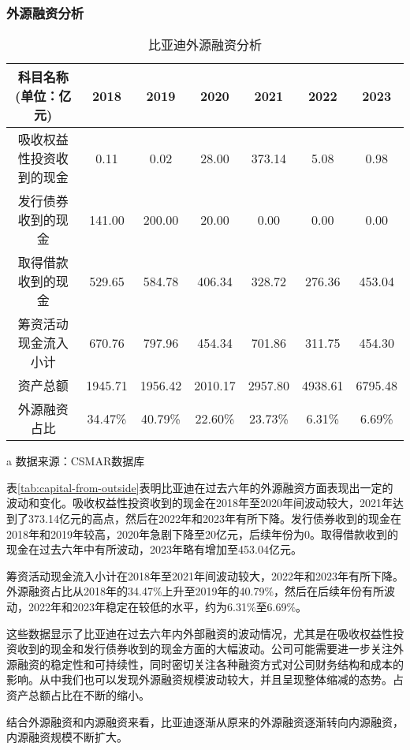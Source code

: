 \subsubsection{外源融资分析}
\begin{table}
  \centering
  \begin{threeparttable}[c]
    \caption{比亚迪外源融资分析}
    \label{tab:capital-from-outside}
    \begin{tabular}{ccccccc}
      \toprule
        科目名称(单位：亿元) & 2018 & 2019 & 2020 & 2021 & 2022 & 2023 \\
      \midrule
        吸收权益性投资收到的现金 & 0.11  & 0.02  & 28.00  & 373.14  & 5.08  & 0.98  \\
        发行债券收到的现金 & 141.00  & 200.00  & 20.00  & 0.00  & 0.00  & 0.00  \\
        取得借款收到的现金 & 529.65  & 584.78  & 406.34  & 328.72  & 276.36  & 453.04  \\
        筹资活动现金流入小计 & 670.76  & 797.96  & 454.34  & 701.86  & 311.75  & 454.30  \\
        资产总额 & 1945.71  & 1956.42  & 2010.17  & 2957.80  & 4938.61  & 6795.48  \\
        外源融资占比 & 34.47\% & 40.79\% & 22.60\% & 23.73\% & 6.31\% & 6.69\% \\
      \bottomrule
    \end{tabular}
    \begin{tablenotes}
      \item [a] 数据来源：CSMAR数据库
    \end{tablenotes}
  \end{threeparttable}
\end{table}
表\eqref{tab:capital-from-outside}表明比亚迪在过去六年的外源融资方面表现出一定的波动和变化。吸收权益性投资收到的现金在2018年至2020年间波动较大，2021年达到了373.14亿元的高点，然后在2022年和2023年有所下降。发行债券收到的现金在2018年和2019年较高，2020年急剧下降至20亿元，后续年份为0。取得借款收到的现金在过去六年中有所波动，2023年略有增加至453.04亿元。

筹资活动现金流入小计在2018年至2021年间波动较大，2022年和2023年有所下降。外源融资占比从2018年的34.47\%上升至2019年的40.79\%，然后在后续年份有所波动，2022年和2023年稳定在较低的水平，约为6.31\%至6.69\%。

这些数据显示了比亚迪在过去六年内外部融资的波动情况，尤其是在吸收权益性投资收到的现金和发行债券收到的现金方面的大幅波动。公司可能需要进一步关注外源融资的稳定性和可持续性，同时密切关注各种融资方式对公司财务结构和成本的影响。从中我们也可以发现外源融资规模波动较大，并且呈现整体缩减的态势。占资产总额占比在不断的缩小。

结合外源融资和内源融资来看，比亚迪逐渐从原来的外源融资逐渐转向内源融资，内源融资规模不断扩大。
